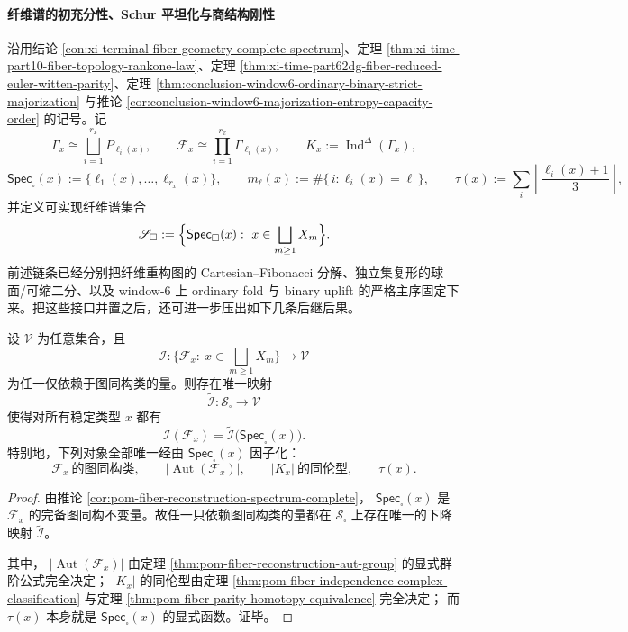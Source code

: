 \paragraph{纤维谱的初充分性、Schur 平坦化与商结构刚性}
沿用结论 \ref{con:xi-terminal-fiber-geometry-complete-spectrum}、定理 \ref{thm:xi-time-part10-fiber-topology-rankone-law}、定理 \ref{thm:xi-time-part62dg-fiber-reduced-euler-witten-parity}、定理 \ref{thm:conclusion-window6-ordinary-binary-strict-majorization} 与推论 \ref{cor:conclusion-window6-majorization-entropy-capacity-order} 的记号。记
\[
\Gamma_x\cong\bigsqcup_{i=1}^{r_x}P_{\ell_i(x)},
\qquad
\mathcal F_x\cong \prod_{i=1}^{r_x}\Gamma_{\ell_i(x)},
\qquad
K_x:=\operatorname{Ind}^{\Delta}(\Gamma_x),
\]
\[
\mathsf{Spec}_{\square}(x):=\{\ell_1(x),\dots,\ell_{r_x}(x)\},
\qquad
m_\ell(x):=\#\{\,i:\ell_i(x)=\ell\,\},
\qquad
\tau(x):=\sum_i\left\lfloor\frac{\ell_i(x)+1}{3}\right\rfloor,
\]
并定义可实现纤维谱集合
\[
\mathscr S_{\square}:=
\Bigl\{
\mathsf{Spec}_{\square}(x):\ x\in\bigsqcup_{m\ge 1}X_m
\Bigr\}.
\]
前述链条已经分别把纤维重构图的 Cartesian--Fibonacci 分解、独立集复形的球面/可缩二分、以及 window-\(6\) 上 ordinary fold 与 binary uplift 的严格主序固定下来。把这些接口并置之后，还可进一步压出如下几条后继后果。

\begin{theorem}\label{thm:conclusion-fiber-spectrum-initial-sufficient-statistic}
设 \(\mathcal V\) 为任意集合，且
\[
\mathcal I:\{\mathcal F_x:\ x\in\bigsqcup_{m\ge 1}X_m\}\longrightarrow \mathcal V
\]
为任一仅依赖于图同构类的量。则存在唯一映射
\[
\widetilde{\mathcal I}:\mathscr S_{\square}\longrightarrow \mathcal V
\]
使得对所有稳定类型 \(x\) 都有
\[
\mathcal I(\mathcal F_x)=\widetilde{\mathcal I}\!\bigl(\mathsf{Spec}_{\square}(x)\bigr).
\]
特别地，下列对象全部唯一经由 \(\mathsf{Spec}_{\square}(x)\) 因子化：
\[
\mathcal F_x\ \text{的图同构类},
\qquad
|\operatorname{Aut}(\mathcal F_x)|,
\qquad
|K_x|\ \text{的同伦型},
\qquad
\tau(x).
\]
\end{theorem}
\begin{proof}
由推论 \ref{cor:pom-fiber-reconstruction-spectrum-complete}，
\(
\mathsf{Spec}_{\square}(x)
\)
是 \(\mathcal F_x\) 的完备图同构不变量。故任一只依赖图同构类的量都在 \(\mathscr S_{\square}\) 上存在唯一的下降映射 \(\widetilde{\mathcal I}\)。

其中，
\(
|\operatorname{Aut}(\mathcal F_x)|
\)
由定理 \ref{thm:pom-fiber-reconstruction-aut-group} 的显式群阶公式完全决定；
\(
|K_x|
\)
的同伦型由定理 \ref{thm:pom-fiber-independence-complex-classification} 与定理 \ref{thm:pom-fiber-parity-homotopy-equivalence} 完全决定；
而
\(
\tau(x)
\)
本身就是 \(\mathsf{Spec}_{\square}(x)\) 的显式函数。证毕。
\end{proof}

